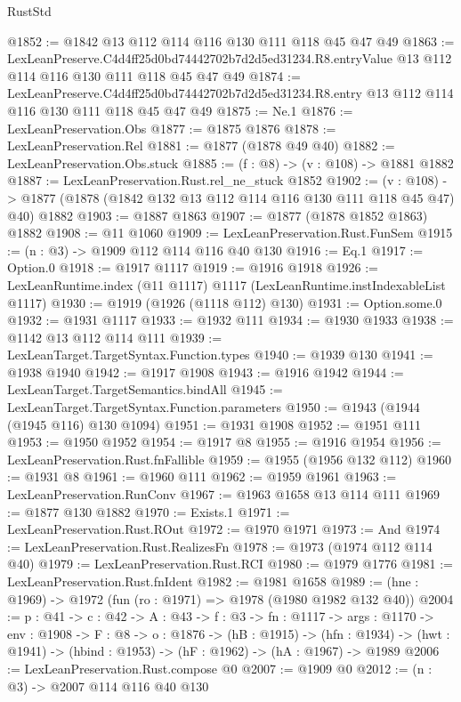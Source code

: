 \begin{lexlean}{RustStd}
\begin{coremodule}
@1852 := @1842 @13 @112 @114 @116 @130 @111 @118 @45 @47 @49
@1863 := LexLeanPreserve.C4d4ff25d0bd74442702b7d2d5ed31234.R8.entryValue
    @13
    @112
    @114
    @116
    @130
    @111
    @118
    @45
    @47
    @49
@1874 := LexLeanPreserve.C4d4ff25d0bd74442702b7d2d5ed31234.R8.entry
    @13
    @112
    @114
    @116
    @130
    @111
    @118
    @45
    @47
    @49
@1875 := Ne.{1}
@1876 := LexLeanPreservation.Obs
@1877 := @1875 @1876
@1878 := LexLeanPreservation.Rel
@1881 := @1877 (@1878 @49 @40)
@1882 := LexLeanPreservation.Obs.stuck
@1885 := (f : @8) -> (v : @108) -> @1881 @1882
@1887 := LexLeanPreservation.Rust.rel_ne_stuck @1852
@1902 := (v : @108) ->
  @1877 (@1878 (@1842 @132 @13 @112 @114 @116 @130 @111 @118 @45 @47) @40) @1882
@1903 := @1887 @1863
@1907 := @1877 (@1878 @1852 @1863) @1882
@1908 := @11 @1060
@1909 := LexLeanPreservation.Rust.FunSem
@1915 := (n : @3) -> @1909 @112 @114 @116 @40 @130
@1916 := Eq.{1}
@1917 := Option.{0}
@1918 := @1917 @1117
@1919 := @1916 @1918
@1926 := LexLeanRuntime.index (@11 @1117) @1117 (LexLeanRuntime.instIndexableList @1117)
@1930 := @1919 (@1926 (@1118 @112) @130)
@1931 := Option.some.{0}
@1932 := @1931 @1117
@1933 := @1932 @111
@1934 := @1930 @1933
@1938 := @1142 @13 @112 @114 @111
@1939 := LexLeanTarget.TargetSyntax.Function.types
@1940 := @1939 @130
@1941 := @1938 @1940
@1942 := @1917 @1908
@1943 := @1916 @1942
@1944 := LexLeanTarget.TargetSemantics.bindAll
@1945 := LexLeanTarget.TargetSyntax.Function.parameters
@1950 := @1943 (@1944 (@1945 @116) @130 @1094)
@1951 := @1931 @1908
@1952 := @1951 @111
@1953 := @1950 @1952
@1954 := @1917 @8
@1955 := @1916 @1954
@1956 := LexLeanPreservation.Rust.fnFallible
@1959 := @1955 (@1956 @132 @112)
@1960 := @1931 @8
@1961 := @1960 @111
@1962 := @1959 @1961
@1963 := LexLeanPreservation.RunConv
@1967 := @1963 @1658 @13 @114 @111
@1969 := @1877 @130 @1882
@1970 := Exists.{1}
@1971 := LexLeanPreservation.Rust.ROut
@1972 := @1970 @1971
@1973 := And
@1974 := LexLeanPreservation.Rust.RealizesFn
@1978 := @1973 (@1974 @112 @114 @40)
@1979 := LexLeanPreservation.Rust.RCI
@1980 := @1979 @1776
@1981 := LexLeanPreservation.Rust.fnIdent
@1982 := @1981 @1658
@1989 := (hne : @1969) -> @1972 (fun (ro : @1971) => @1978 (@1980 @1982 @132 @40))
@2004 := {p : @41} ->
  {c : @42} ->
  {A : @43} ->
  {f : @3} ->
  {fn : @1117} ->
  {args : @1170} ->
  {env : @1908} ->
  {F : @8} ->
  {o : @1876} ->
  (hB : @1915) ->
  (hfn : @1934) -> (hwt : @1941) -> (hbind : @1953) -> (hF : @1962) -> (hA : @1967) -> @1989
@2006 := LexLeanPreservation.Rust.compose @0
@2007 := @1909 @0
@2012 := (n : @3) -> @2007 @114 @116 @40 @130

\end{coremodule}
\end{lexlean}
